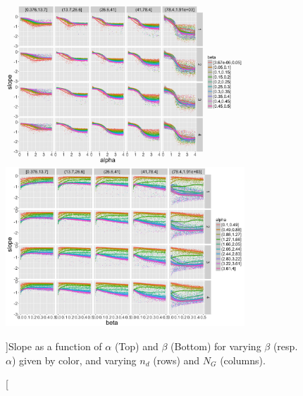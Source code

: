 \begin{figure}
\centering
\includegraphics[width=0.8\textwidth]{Figures/Density/slope_alpha}
\includegraphics[width=0.8\textwidth]{Figures/Density/slope_beta}
\caption[][]{Slope as a function of $\alpha$ (Top) and $\beta$ (Bottom) for varying $\beta$ (resp. $\alpha$) given by color, and varying $n_d$ (rows) and $N_G$ (columns).}{}
\label{fig:slope}
\end{figure}



